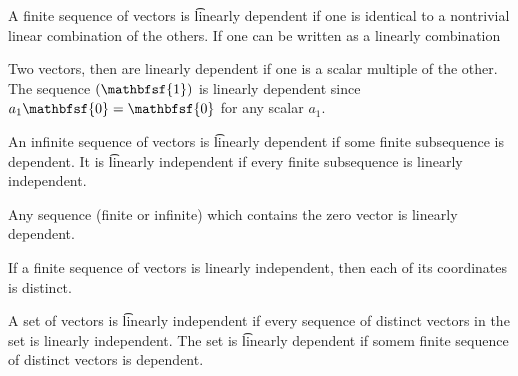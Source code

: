 A finite sequence of vectors is \t{linearly dependent} if one is identical to a nontrivial linear combination of the others.
If one can be written as a linearly combination

Two vectors, then are linearly dependent if one is a scalar multiple of the other.
The sequence $(\mathbfsf{1})$ is linearly dependent since $a_1 \mathbfsf{0} = \mathbfsf{0}$ for any scalar $a_1$.

An infinite sequence of vectors is \t{linearly dependent} if some finite subsequence is dependent.
It is \t{linearly independent} if every finite subsequence is linearly independent.

Any sequence (finite or infinite) which contains the zero vector is linearly dependent.

If a finite sequence of vectors is linearly independent, then each of its coordinates is distinct.

A set of vectors is \t{linearly independent} if every sequence of distinct vectors in the set is linearly independent.
The set is \t{linearly dependent} if somem finite sequence of distinct vectors is dependent.
